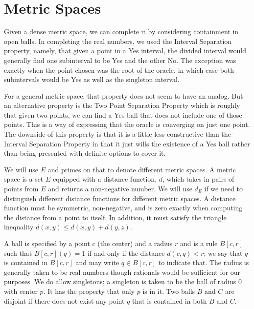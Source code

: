 \documentclass[12pt]{article}
\begin{document}
\section{Metric Spaces}

Given a dense metric space, we can complete it by considering containment in open balls. In completing the real numbers, we used the Interval Separation property, namely, that given a point in a Yes interval, the divided interval would generally find one subinterval to be Yes and the other No. The exception was exactly when the point chosen was the root of the oracle, in which case both subintervals would be Yes as well as the singleton interval. 

For a general metric space, that property does not seem to have an analog. But an alternative property is the Two Point Separation Property which is roughly that given two points, we can find a Yes ball that does not include one of those points. This is a way of expressing that the oracle is converging on just one point. The downside of this property is that it is a little less constructive than the Interval Separation Property in that it just wills the existence of a Yes ball rather than being presented with definite options to cover it. 

We will use $E$ and primes on that to denote different metric spaces. A metric space is a set $E$ equipped with a distance function, $d$, which takes in pairs of points from $E$ and returns a non-negative number. We will use $d_E$ if we need to distinguish different distance functions for different metric spaces. A distance function must be symmetric, non-negative, and is zero exactly when computing the distance from a point to itself. In addition, it must satisfy the triangle inequality $d(x,y) \leq d(x,y) + d(y,z)$. 

A ball is specified by a point $c$ (the center) and a radius $r$ and is a rule $B[c,r]$ such that $B[c,r](q) = 1$ if and only if the distance $d(c,q) < r$; we say that $q$ is contained in $B[c,r]$ and may write $q \in B[c,r]$ to indicate that. The radius is generally taken to be real numbers though rationals would be sufficient for our purposes.  We do allow singletons; a singleton is taken to be the ball of radius 0 with center $p$. It has the property that only $p$ is in it. Two balls $B$ and $C$ are disjoint if there does not exist any point $q$ that is contained in both $B$ and $C$.
\end{document}

